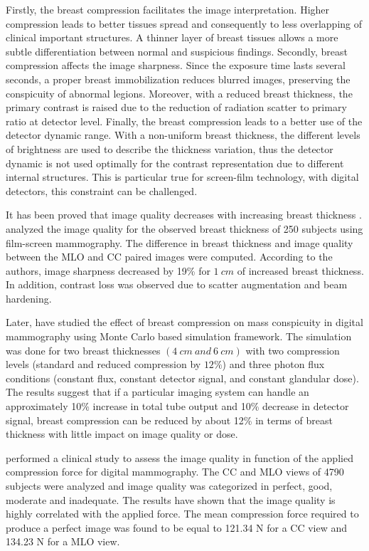  Firstly, the breast compression facilitates the image interpretation. Higher compression leads to better tissues spread and consequently to less overlapping of clinical important structures. A thinner layer of breast tissues allows a more subtle differentiation between normal and suspicious findings. Secondly, breast compression affects the image sharpness. Since the exposure time lasts several seconds, a proper breast immobilization reduces blurred images, preserving the conspicuity of abnormal legions. Moreover, with a reduced breast thickness, the primary contrast is raised due to the reduction of radiation scatter to primary ratio at detector level. Finally, the breast compression leads to a better use of the detector dynamic range. With a non-uniform breast thickness, the different levels of brightness are used to describe the thickness variation, thus the detector dynamic is not used optimally for the contrast representation due to different internal structures. This is particular true for screen-film technology, with digital detectors, this constraint can be challenged.

It has been proved that image quality decreases with increasing breast thickness \citep{ko_dose_2013,helvie_breast_1994,saunders_effect_2008,poulos_breast_2003}. \cite{helvie_breast_1994} analyzed the image quality for the observed breast thickness of 250 subjects using film-screen mammography.  The difference in breast thickness and image quality between the MLO and CC paired images were computed. According to the authors, image sharpness decreased by 19\% for $1\ cm$ of increased breast thickness. In addition, contrast loss was observed due to scatter augmentation and beam hardening.

Later, \cite{saunders_effect_2008} have studied the effect of breast compression on mass conspicuity in digital mammography using Monte Carlo based simulation framework. The simulation was done for two breast thicknesses $(4\ cm\ and\ 6\ cm)$ with two compression levels (standard and reduced compression by $12\%$) and three photon flux conditions (constant
flux, constant detector signal, and constant glandular dose). The results suggest that if a particular imaging system can handle an approximately 10\% increase in total tube output and 10\% decrease in detector signal, breast compression can be reduced by about 12\% in terms of breast thickness with little impact on image quality or dose.

\cite{oleary_compression_2011} performed a clinical study to assess the image quality in function of the applied compression force for digital mammography. The CC and MLO views of 4790 subjects were analyzed and image quality was categorized in  perfect, good, moderate and
inadequate. The results have shown that the image quality is highly correlated with the applied force. The mean compression force required to produce a perfect image was found to be equal to 121.34 N for a CC view and 134.23 N for a MLO view.

